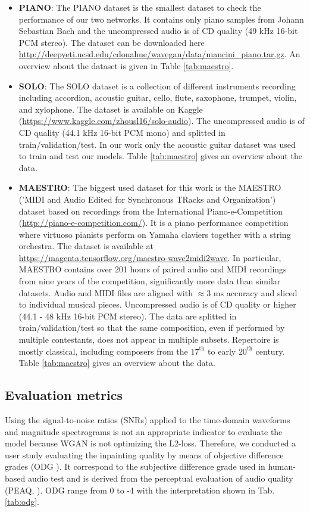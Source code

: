\documentclass{article} %
\begin{document}
\begin{itemize}
    \item \textbf{PIANO}: The PIANO dataset is the smallest dataset to check the performance of our two networks. It contains only piano samples from Johann Sebastian Bach and the uncompressed audio is of CD quality (49 kHz 16-bit PCM stereo). The dataset can be downloaded here \url{http://deepyeti.ucsd.edu/cdonahue/wavegan/data/mancini_piano.tar.gz}. An overview about the dataset is given in Table \ref{tab:maestro}.
    \item \textbf{SOLO}: The SOLO dataset is a collection of different instruments recording including accordion, acoustic guitar, cello, flute, saxophone, trumpet, violin, and xylophone. The dataset is available on Kaggle (\url{https://www.kaggle.com/zhousl16/solo-audio}). The uncompressed audio is of CD quality (44.1 kHz 16-bit PCM mono) and splitted in train/validation/test. In our work only the acoustic guitar dataset was used to train and test our models. Table \ref{tab:maestro} gives an overview about the data.
    \item \textbf{MAESTRO}: The biggest used dataset for this work is the MAESTRO ('MIDI and Audio Edited for Synchronous TRacks and Organization') dataset based on recordings from the International Piano-e-Competition (\url{http://piano-e-competition.com/}). It is a piano performance competition where virtuoso pianists perform on Yamaha claviers together with a string orchestra. The dataset is available at \url{https://magenta.tensorflow.org/maestro-wave2midi2wave}. In particular, MAESTRO contains over 201 hours of paired audio and MIDI recordings from nine years of the competition, significantly more data than similar datasets. Audio and MIDI files are aligned with $\approx 3 \textrm{ ms}$ accuracy and sliced to individual musical pieces. Uncompressed audio is of CD quality or higher (44.1 - 48 kHz 16-bit PCM stereo). The data are splitted in train/validation/test so that the same composition, even if performed by multiple contestants, does not appear in multiple subsets. Repertoire is mostly classical, including composers from the $17^\textrm{th}$ to early $20^\textrm{th}$ century. Table \ref{tab:maestro} gives an overview about the data.
\end{itemize}


\subsection{Evaluation metrics}
Using the signal-to-noise ratios (SNRs) applied to the time-domain waveforms and magnitude spectrograms is not an appropriate indicator to evaluate the model because WGAN is not optimizing the L2-loss. Therefore, we conducted a user study evaluating the inpainting quality by means of objective difference grades (ODG \cite{recommendatioin2001}). It correspond to the subjective difference grade used in human-based audio test and is derived from the perceptual evaluation of audio quality (PEAQ, \cite{recommendatioin2001}). ODG range from 0 to -4 with the interpretation shown in Tab. \ref{tab:odg}.
\end{document}
